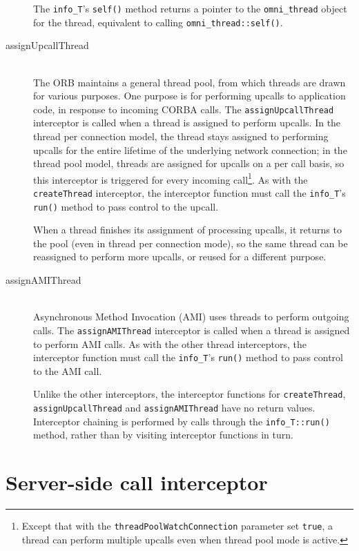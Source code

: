 \documentclass[11pt,oneside,a4paper]{book}
\newcommand{\type}[1]{\texttt{#1}}
\newcommand{\code}[1]{\texttt{#1}}
\newcommand{\op}[1]{\texttt{#1()}}
\begin{document}
\begin{description}
The \type{info\_T}'s \op{self} method returns a pointer to the
\type{omni\_thread} object for the thread, equivalent to calling
\op{omni\_thread::self}.


\item[assignUpcallThread]\mbox{}\\
%
The ORB maintains a general thread pool, from which threads are drawn
for various purposes. One purpose is for performing upcalls to
application code, in response to incoming CORBA calls. The
\code{assignUpcallThread} interceptor is called when a thread is
assigned to perform upcalls. In the thread per connection model, the
thread stays assigned to performing upcalls for the entire lifetime of
the underlying network connection; in the thread pool model, threads
are assigned for upcalls on a per call basis, so this interceptor is
triggered for every incoming call\footnote{Except that with the
  \code{threadPoolWatchConnection} parameter set \code{true}, a thread
  can perform multiple upcalls even when thread pool mode is
  active.}. As with the \code{createThread} interceptor, the
interceptor function must call the \type{info\_T}'s \op{run} method to
pass control to the upcall.

When a thread finishes its assignment of processing upcalls, it
returns to the pool (even in thread per connection mode), so the same
thread can be reassigned to perform more upcalls, or reused for a
different purpose.


\item[assignAMIThread]\mbox{}\\
%
Asynchronous Method Invocation (AMI) uses threads to perform outgoing
calls. The \code{assignAMIThread} interceptor is called when a thread
is assigned to perform AMI calls. As with the other thread
interceptors, the interceptor function must call the \type{info\_T}'s
\op{run} method to pass control to the AMI call.

Unlike the other interceptors, the interceptor functions for
\code{createThread}, \code{assignUpcallThread} and
\code{assignAMIThread} have no return values. Interceptor chaining is
performed by calls through the \op{info\_T::run} method, rather than
by visiting interceptor functions in turn.

\end{description}


\section{Server-side call interceptor}
\end{document}
